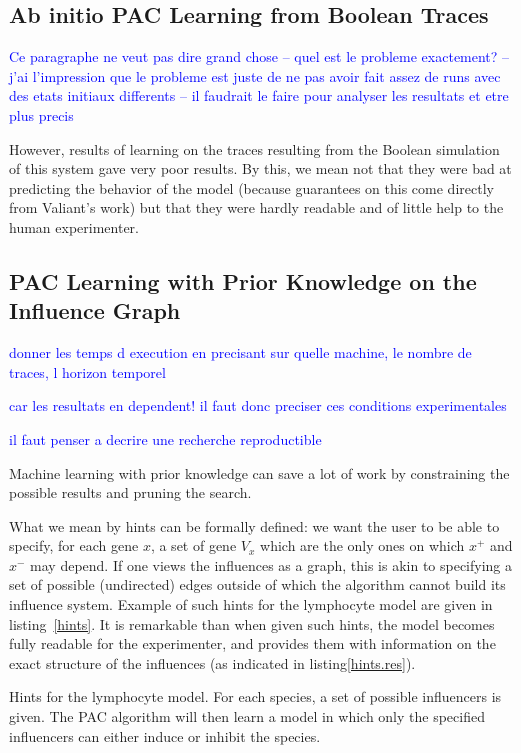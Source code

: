 \documentclass{llncs}
\newcommand{\francois}[1]{\textcolor{blue}{#1}}
\begin{document}
\subsection{Ab initio PAC Learning from Boolean Traces}

\francois{Ce paragraphe ne veut pas dire grand chose --
quel est le probleme exactement?
-- j'ai l'impression que le probleme est juste de ne pas avoir fait assez de runs avec des etats initiaux differents
-- il faudrait le faire pour analyser les resultats et etre plus precis}

However, results of learning on the traces resulting from the Boolean simulation of this system gave very poor results. By this, we mean not that they were bad at predicting the behavior of the model (because guarantees on this come directly from Valiant's work) but that they were hardly readable and of little help to the human experimenter. 

\subsection{PAC Learning with Prior Knowledge on the Influence Graph}

\francois{donner les temps d execution en precisant sur quelle machine, le nombre de traces, l horizon temporel }

\francois{car les resultats en dependent! il faut donc preciser ces conditions experimentales}

\francois{il faut penser a decrire une recherche reproductible}


Machine learning with prior knowledge can save a lot of work by constraining the possible results and pruning the search.

What we mean by hints can be formally defined: we want the user to be able to specify, for each gene $x$, a set of gene $V_x$ which are the only ones on which $x^+$ and $x^-$ may depend. If one views the influences as a graph, this is akin to specifying a set of possible (undirected) edges outside of which the algorithm cannot build its influence system. Example of such hints for the lymphocyte model are given in listing~\ref{hints}. It is remarkable than when given such hints, the model becomes fully readable for the experimenter, and provides them with information on the exact structure of the influences (as indicated in listing\ref{hints.res}).

\begin{listfig}[htb]
	
	\caption{Hints for the lymphocyte model. For each species, a set of possible influencers is given. The PAC algorithm will then learn a model in which only the specified influencers can either induce or inhibit the species.\label{hints}}
\end{listfig}
\end{document}
